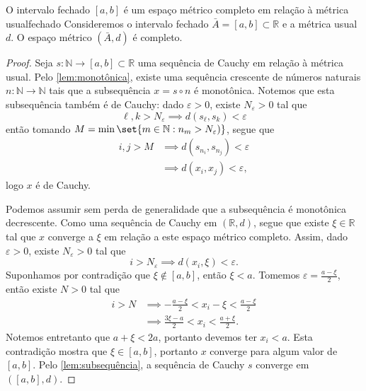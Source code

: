 \begin{proposition}{O intervalo fechado \([a,b]\) é um espaço métrico completo em relação à métrica usual}{fechado}
    Consideremos o intervalo fechado \(\bar{A} = [a,b] \subset \mathbb{R}\) e a métrica usual \(d\). O espaço métrico \((\bar{A}, d)\) é completo.
\end{proposition}
\begin{proof}
    Seja \(s : \mathbb{N} \to [a,b] \subset \mathbb{R}\) uma sequência de Cauchy em relação à métrica usual. Pelo \cref{lem:monotônica}, existe uma sequência crescente de números naturais \(n : \mathbb{N} \to \mathbb{N}\) tais que a subsequência \(x = s \circ n\) é monotônica. Notemos que esta subsequência também é de Cauchy: dado \(\varepsilon > 0\), existe \(N_{\varepsilon} > 0\) tal que
    \begin{equation*}
        \ell,k > N_{\varepsilon} \implies d(s_\ell, s_k) < \varepsilon
    \end{equation*}
    então tomando \(M = \min\set{m \in \mathbb{N} : n_m > N_{\varepsilon})}\), segue que
    \begin{align*}
        i,j > M &\implies d(s_{n_i},s_{n_j}) < \varepsilon\\
                &\implies d(x_i, x_j) < \varepsilon,
    \end{align*}
    logo \(x\) é de Cauchy.

    Podemos assumir sem perda de generalidade que a subsequência é monotônica decrescente. Como uma sequência de Cauchy em \((\mathbb{R}, d)\), segue que existe \(\xi \in \mathbb{R}\) tal que \(x\) converge a \(\xi\) em relação a este espaço métrico completo. Assim, dado \(\varepsilon > 0\), existe \(N_{\varepsilon} > 0\) tal que
    \begin{equation*}
        i > N_{\varepsilon} \implies d(x_i, \xi) < \varepsilon.
    \end{equation*}
    Suponhamos por contradição que \(\xi \notin [a,b]\), então \(\xi < a\). Tomemos \(\varepsilon = \frac{a - \xi}2\), então existe \(N > 0\) tal que
    \begin{align*}
        i > N &\implies - \frac{a - \xi}2 < x_i - \xi < \frac{a - \xi}2\\
              &\implies \frac{3\xi - a}2 < x_i < \frac{a + \xi}2.
    \end{align*}
    Notemos entretanto que \(a + \xi < 2a\), portanto devemos ter \(x_i < a\). Esta contradição mostra que \(\xi \in [a,b]\), portanto \(x\) converge para algum valor de \([a,b]\). Pelo \cref{lem:subsequência}, a sequência de Cauchy \(s\) converge em \(([a,b],d)\).
\end{proof}

